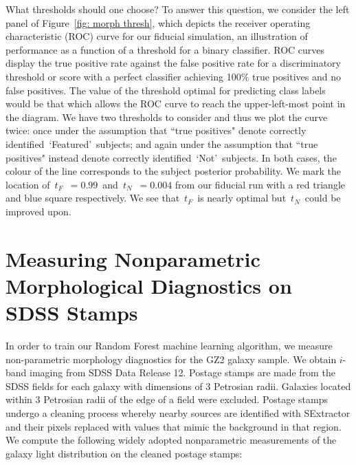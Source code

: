 \documentclass[twocolumn,  trackchanges, ]{aastex6}%
\newcommand{\tf}{$t_F$}
\newcommand{\tn}{$t_N$}
\newcommand{\feat}{`Featured'}
\newcommand{\notfeat}{`Not'}
\begin{document}
What thresholds should one choose? To answer this question, we consider the left panel of
Figure~\ref{fig: morph thresh}, which depicts the receiver operating 
characteristic (ROC) curve for our fiducial simulation, an illustration of performance as a 
function of a threshold for a binary classifier. 
ROC curves display the true positive rate against the false positive rate for 
a discriminatory threshold or score with a perfect classifier achieving 100\% true positives
and no false positives. The value of the threshold optimal for predicting class labels would 
be that which allows the ROC curve to reach the upper-left-most point in the diagram. 
We have two thresholds to consider and thus we plot the curve twice: 
once under the assumption that ``true positives" denote correctly identified~\feat~subjects; 
and again under the assumption that ``true positives" instead denote correctly identified~\notfeat~subjects.  In both cases, the colour of the line corresponds to the 
subject posterior probability. We mark the location of~\tf~$=0.99$~and~\tn~$=0.004$
from our fiducial run with a red triangle and blue square respectively. 
 We see that~\tf~is nearly optimal but~\tn~could be improved upon. 



\section{Measuring Nonparametric Morphological Diagnostics on SDSS Stamps}
\label{sec: measuring morphology}

In order to train our Random Forest machine learning algorithm, we measure  non-parametric morphology diagnostics for the GZ2 galaxy sample. We obtain $i$-band imaging from SDSS Data Release 12. Postage stamps are made from the SDSS fields for each galaxy with dimensions of 3 Petrosian radii. Galaxies located within 3 Petrosian radii of the edge of a field were excluded.  Postage stamps undergo a cleaning process whereby nearby sources are identified with SExtractor \citep[ver. 2.8.6;][]{sextractor} and their pixels replaced with values that mimic the background in that region. We compute the following widely adopted nonparametric measurements  of the galaxy light distribution on the cleaned postage stamps:
\end{document}
